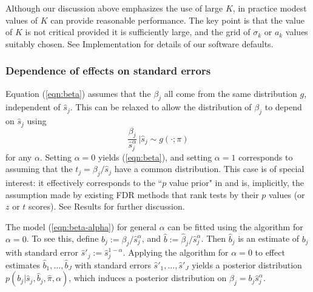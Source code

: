 \documentclass[11pt]{article}
\def\bhat{\hat{\beta}}
\def\shat{\hat{s}}
\def\qvalue{{\tt qvalue}\xspace}
\def\locfdr{{\tt locfdr}\xspace}
\def\mixfdr{{\tt mixfdr}\xspace}
\begin{document}
Although our discussion above emphasizes the use of large $K$, in practice modest values of $K$ can provide reasonable performance. 
The key point is that the value of $K$ is not critical provided it is sufficiently large, and the grid of $\sigma_k$ or $a_k$ values suitably chosen.
See Implementation for details of our software defaults.


\subsubsection*{Dependence of effects on standard errors}

Equation (\ref{eqn:beta}) assumes that the $\beta_j$ all come from the same distribution $g$, independent of $\shat_j$.
This can be relaxed to allow the distribution of $\beta_j$ to depend on $\shat_j$ using
 \begin{equation} \label{eqn:beta-alpha}
 \frac{\beta_j}{\shat_j^\alpha} \, \big |  \shat_j \sim g(\cdot; \pi)
 \end{equation}
for any $\alpha$. Setting $\alpha=0$ yields (\ref{eqn:beta}), and setting $\alpha=1$ corresponds to
assuming that the $t_j =\beta_j/ \shat_j$ have a common distribution. This case is of special interest:
it effectively corresponds to the ``$p$ value prior" in \cite{wakefield:2009} and is, implicitly, 
the assumption made by existing FDR methods that rank tests by their $p$ values (or $z$ or $t$ scores). See Results for further discussion.
 
The model (\ref{eqn:beta-alpha}) for general $\alpha$ can be fitted using the algorithm for $\alpha=0$. 
To see this, define $b_j:= \beta_j/ \shat_j^\alpha$, and $\hat{b} := \bhat_j/\shat_j^\alpha$. Then $\hat{b}_j$ is an estimate of $b_j$ with
 standard error $\shat'_j:=\shat_j^{1-\alpha}$. 
 Applying the algorithm for $\alpha=0$ to effect estimates $\hat{b}_1,\dots,\hat{b}_J$ with standard errors $\shat'_1,\dots,\shat'_J$
yields a posterior distribution $p(b_j | \shat_j, \hat{b}_j, \hat{\pi}, \alpha)$, which induces a posterior distribution on $\beta_j = b_j \shat_j^\alpha$.
\end{document}
